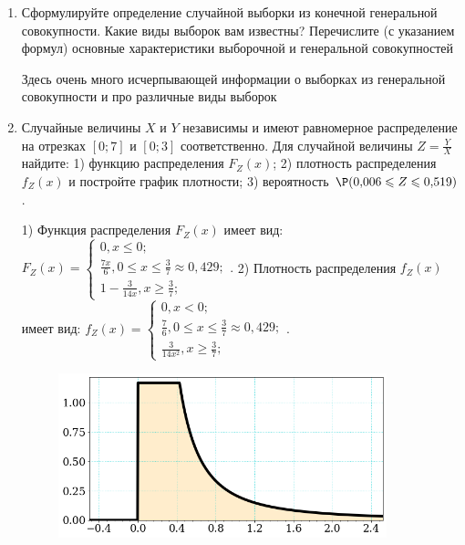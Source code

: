 \documentclass[a4paper,14pt]{article}
\begin{document}
\begin{enumerate}


\item


Сформулируйте определение случайной выборки из конечной генеральной совокупности. Какие
виды выборок вам известны? Перечислите (с указанием формул) основные характеристики выборочной и генеральной совокупностей




Здесь очень много исчерпывающей информации о выборках из генеральной совокупности и про различные виды выборок


\item



Случайные величины $X$ и $Y$ независимы и имеют равномерное
распределение на отрезках $[0;7]$ и $[0;3]$ соответственно. Для случайной величины $Z=\frac{Y}{X}$ найдите: 
1) функцию распределения $F_Z(x)$;
2) плотность распределения $f_Z(x)$ и постройте график плотности;
3) вероятность $\P(0,\!006\leqslant Z\leqslant 0,\!519)$.




1) Функция распределения $F_Z(x)$ имеет вид:
$
F_Z(x)=\left\{
\begin{array}{l}
0, x\leqslant 0;\\
\frac{7 x}{6}, 0\leqslant x\leqslant \frac{3}{7}\approx 0,\!429;\\
1 - \frac{3}{14 x}, x\geqslant\frac{3}{7};
\end{array}.
\right.
$
2) Плотность распределения $f_Z(x)$ имеет вид:
$
f_Z(x)=\left\{
\begin{array}{l}
0, x<0;\\
\frac{7}{6}, 0\leqslant x\leqslant \frac{3}{7}\approx 0,\!429;\\
\frac{3}{14 x^{2}}, x\geqslant\frac{3}{7};
\end{array}.
\right.
$


\begin{figure}[H]
    \includegraphics[width=0.9\textwidth]{2_53d18}
\end{figure}



\end{enumerate}
\end{document}
